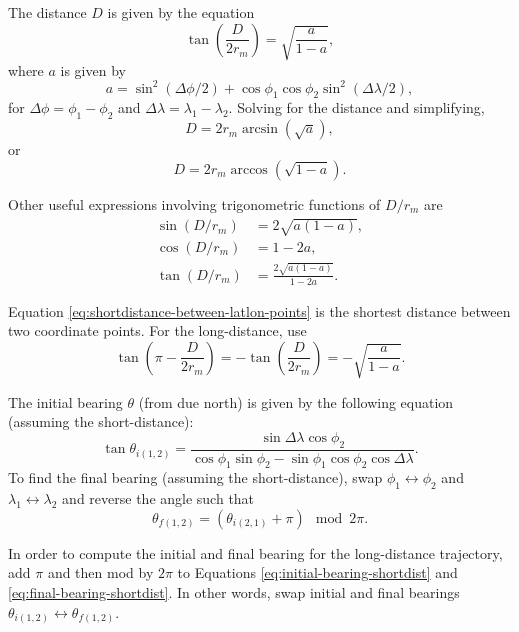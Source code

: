 \documentclass{article}
\begin{document}
The distance $D$ is given by the equation
\begin{equation}\label{eq:shortdistance-between-latlon-points}
\tan\left(\frac{D}{2r_m}\right) = \sqrt{\frac{a}{1-a}},
\end{equation}
where $a$ is given by
\begin{equation}
a = \sin^2(\Delta\phi/2) + \cos\phi_1\cos\phi_2\sin^2(\Delta\lambda/2),
\end{equation}
for $\Delta\phi = \phi_1-\phi_2$ and $\Delta\lambda = \lambda_1-\lambda_2$. Solving for the distance and simplifying,
\begin{equation}
D = 2r_m\arcsin(\sqrt{a}),
\end{equation}
or
\begin{equation}
D = 2r_m\arccos(\sqrt{1-a}).
\end{equation}

Other useful expressions involving trigonometric functions of $D/r_m$ are
\begin{align}
\sin(D/r_m) &= 2\sqrt{a(1-a)},\\
\cos(D/r_m) &= 1-2a,\\
\tan(D/r_m) &= \frac{2\sqrt{a(1-a)}}{1-2a}.
\end{align}

Equation \eqref{eq:shortdistance-between-latlon-points} is the shortest distance between two coordinate points. For the long-distance, use
\begin{equation}
\tan\left(\pi-\frac{D}{2r_m}\right) = -\tan\left(\frac{D}{2r_m}\right) = -\sqrt{\frac{a}{1-a}}.
\end{equation}

The initial bearing $\theta$ %
(from due north) is given by the following equation (assuming the short-distance):
\begin{equation}\label{eq:initial-bearing-shortdist}
\tan\theta_{i(1,2)} = \frac{\sin\Delta\lambda\cos\phi_2}{\cos\phi_1\sin\phi_2-\sin\phi_1\cos\phi_2\cos\Delta\lambda}.
\end{equation}
To find the final bearing (assuming the short-distance), swap $\phi_1\longleftrightarrow\phi_2$ and $\lambda_1\longleftrightarrow\lambda_2$ and reverse the angle such that
\begin{equation}\label{eq:final-bearing-shortdist}
\theta_{f(1,2)} = (\theta_{i(2,1)} + \pi)\mod 2\pi.
\end{equation}

In order to compute the initial and final bearing for the long-distance trajectory, add $\pi$ and then mod by $2\pi$ to Equations \eqref{eq:initial-bearing-shortdist} and \eqref{eq:final-bearing-shortdist}. In other words, swap initial and final bearings $\theta_{i(1,2)}\longleftrightarrow\theta_{f(1,2)}$.\\
\end{document}
